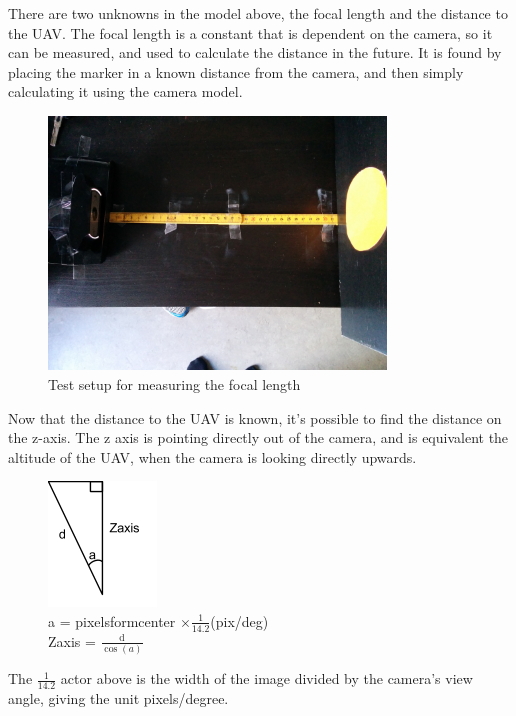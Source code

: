 There are two unknowns in the model above, the focal length and the distance to the UAV. The focal length is a constant that is dependent on the camera, so it can be measured, and used to calculate the distance in the future. 
It is found by placing the marker in a known distance from the camera, and then simply calculating it using the camera model.

\begin{figure}[h!]
	\centering
	\includegraphics[width=0.8\textwidth]{imgs/focal_length_test}
	\caption{Test setup for measuring the focal length}
\end{figure}

Now that the distance to the UAV is known, it's possible to find the distance on the z-axis. The z axis is pointing directly out of the camera, and is equivalent the altitude of the UAV, when the camera is looking directly upwards. 

\begin{figure}[h!]
	\centering
	\includegraphics{imgs/focal_length_z_length}\\
	a = pixelsformcenter $ \times \frac{1}{14.2}$(pix/deg)\\
	Zaxis = $\frac{\mathrm{d}}{\cos{(a)}}$
\end{figure}

The $\frac{1}{14.2}$ actor above is the width of the image divided by the camera's view angle, giving the unit pixels/degree.

